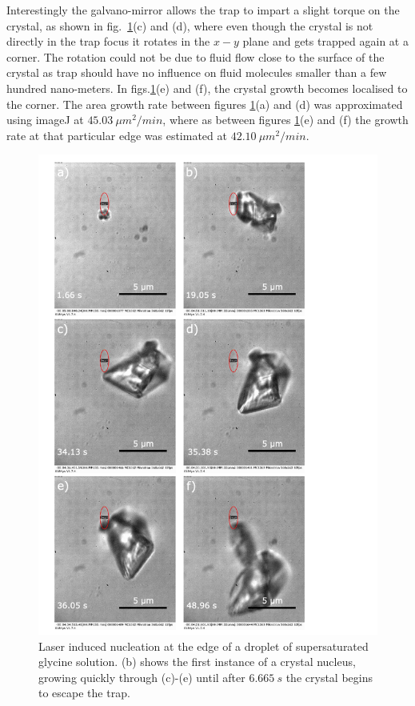 Interestingly the galvano-mirror allows the trap to impart a slight torque 
on the crystal, as shown in fig.~\ref{fig:eliptical_beam_1}(c) and (d), 
where even though the crystal is not directly in the trap focus it rotates 
in the $x-y$ plane and gets trapped again at a corner. The rotation could 
not be due to fluid flow close to the surface of the crystal as trap should 
have no influence on fluid molecules smaller than a few hundred nano-meters. 
In figs.\ref{fig:eliptical_beam_1}(e) and (f), the crystal growth becomes 
localised to the corner. The area growth rate between figures \ref{fig:eliptical_beam_1}(a) and (d) was approximated using imageJ at $45.03\ 
\mu m^2 /min$, where as between figures \ref{fig:eliptical_beam_1}(e) and 
(f) the growth rate at that particular edge was estimated at $42.10\ \mu m^2/min$. 
\begin{figure}[h!]
	\centering
	\includegraphics[width=0.9\linewidth]{frames_eliptical_beam.pdf}
	\caption{Laser induced nucleation at the edge of a droplet of 
		supersaturated glycine solution. (b) shows the first instance 
		of a crystal nucleus, growing quickly through (c)-(e) until 
		after $6.665\ s$ the crystal begins to escape the trap.}
	\label{fig:eliptical_beam_1}
\end{figure}
 
